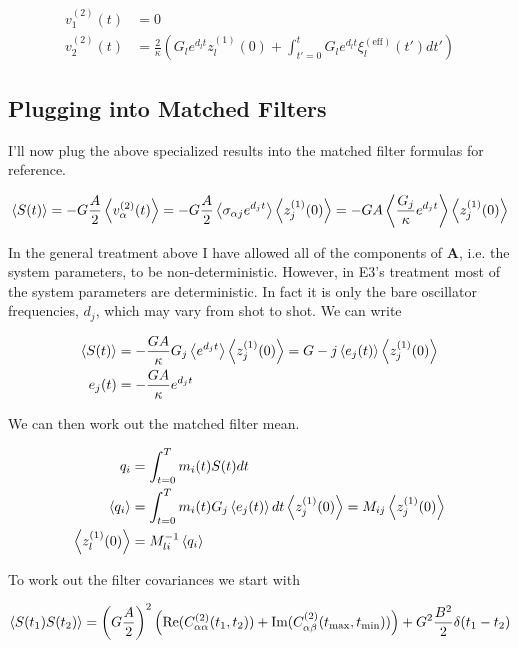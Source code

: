 \documentclass[12pt]{article}
\newcommand{\bv}[1]{\boldsymbol{#1}}
\begin{document}
\begin{align}
v^{(2)}_1(t) &= 0\\
v^{(2)}_2(t) &= \frac{2}{\kappa}\left(G_l e^{d_l t}z^{(1)}_l(0) + \int_{t'=0}^t G_l e^{d_l t}\xi^{(\text{eff})}_l(t') dt'\right)
\end{align}

\subsection{Plugging into Matched Filters}

I'll now plug the above specialized results into the matched filter formulas for reference.

\begin{align}
\Braket{S(t)} = -G\frac{A}{2}\Braket{v^{(2)}_{\alpha}(t)} = -G\frac{A}{2}\Braket{\sigma_{\alpha j} e^{d_j t}}\Braket{z^{(1)}_j(0)} = -GA\Braket{\frac{G_j}{\kappa}e^{d_j t}}\Braket{z^{(1)}_j(0)}
\end{align}

In the general treatment above I have allowed all of the components of $\bv{A}$, i.e. the system parameters, to be non-deterministic. However, in E3's treatment most of the system parameters are deterministic. In fact it is only the bare oscillator frequencies, $d_j$, which may vary from shot to shot. We can write

\begin{align}
\Braket{S(t)} &= -\frac{GA}{\kappa}G_j \Braket{e^{d_j t}}\Braket{z^{(1)}_j(0)} = G-j \Braket{e_j(t)}\Braket{z^{(1)}_j(0)}\\
e_j(t) &= -\frac{GA}{\kappa} e^{d_j t}
\end{align}

We can then work out the matched filter mean.

\begin{align}
q_i &= \int_{t=0}^T m_i(t) S(t) dt\\
\Braket{q_i} &= \int_{t=0}^T m_i(t) G_j \Braket{e_j(t)} dt \Braket{z^{(1)}_j(0)} = M_{ij} \Braket{z^{(1)}_j(0)}\\
\Braket{z^{(1)}_l(0)} &= M^{-1}_{li} \Braket{q_i}
\end{align}

To work out the filter covariances we start with

\begin{align}
\Braket{S(t_1)S(t_2)} = \left(G\frac{A}{2}\right)^2\left(\text{Re}(C^{(2)}_{\alpha\alpha}(t_1,t_2)) + \text{Im}(C^{(2)}_{\alpha\beta}(t_{\text{max}},t_{\text{min}}))\right) + G^2\frac{B^2}{2}\delta(t_1-t_2)
\end{align}
\end{document}
